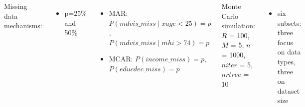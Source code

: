 \documentclass[20pt,margin=1in,innermargin=-4.5in,blockverticalspace=-0.25in]{tikzposter}
\begin{document}
\begin{columns}
{        Missing data mechanisms:
        \vspace{-0.5em}
        \begin{itemize}
            \item p=25\% and 50\%
        \end{itemize}
        \vspace{-1.5em}
        \begin{itemize}
            \item MAR: $P(mdvis\_miss \mid xage<25) = p$,  $P(mdvis\_miss \mid mhi>74) = p$ 
            \vspace{-0.5em}
            \item MCAR: $P(income\_miss) = p$, $P(educdec\_miss) = p$
        \end{itemize}
        
        \vspace{-0.5em}
        
        Monte Carlo simulation: $R$ = 100, $M$ = 5, $n$ = 1000, $niter$ = 5, $nrtree$ = 10
        \vspace{-0.5em}
        \begin{itemize}
            \item six subsets: three focus on data types, three on dataset size
        \end{itemize}
        \vspace{-1em}
    }


\end{columns}
\end{document}
